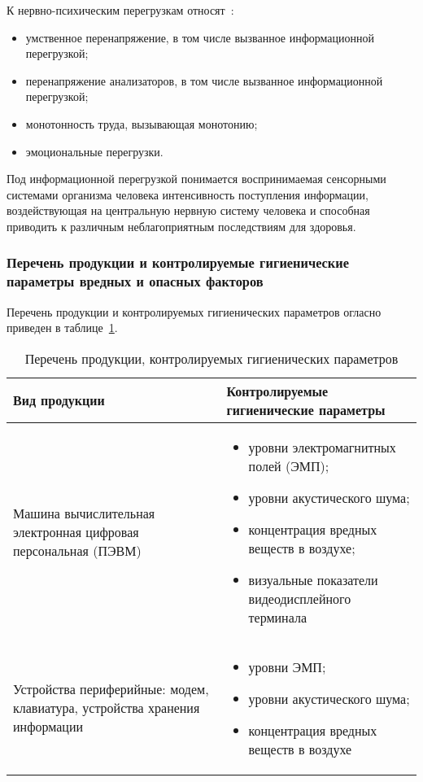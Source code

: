 К нервно-психическим перегрузкам относят~\cite{gost_12.0.003-2015}:
\begin{itemize}
 \item умственное перенапряжение, в том числе вызванное информационной перегрузкой;
 \item перенапряжение анализаторов, в том числе вызванное информационной перегрузкой;
 \item монотонность труда, вызывающая монотонию;
 \item эмоциональные перегрузки.
\end{itemize}

Под информационной перегрузкой понимается воспринимаемая сенсорными системами организма
человека интенсивность поступления информации, воздействующая на центральную нервную систему человека
и способная приводить к различным неблагоприятным последствиям для здоровья.

\subsubsection{Перечень продукции и контролируемые гигиенические параметры вредных и опасных факторов}

Перечень продукции и контролируемых гигиенических параметров огласно~\cite{sanpin_2.4.1340-03} 
приведен в таблице~\ref{tab:life_1}.

\begin{table}[h!]
\caption{ Перечень продукции, контролируемых гигиенических параметров }
\label{tab:life_1}
\begin{center}
\begin{tabularx}{\linewidth}{|X|X|}
\hline
Вид продукции & Контролируемые гигиенические параметры\\
\hline
\item Машина вычислительная электронная цифровая персональная (ПЭВМ) & 
\begin{itemize}
 \item уровни электромагнитных полей (ЭМП);
 \item уровни акустического шума;
 \item концентрация вредных веществ в воздухе;
 \item визуальные показатели видеодисплейного терминала
\end{itemize}									     
\\
\hline
\item Устройства периферийные: модем, клавиатура, устройства хранения информации & 
\begin{itemize}
 \item уровни ЭМП;
 \item уровни акустического шума;
 \item концентрация вредных веществ в воздухе
\end{itemize}
 \\
\hline
\end{tabularx}
\end{center}
\end{table}




